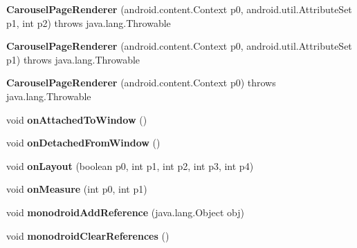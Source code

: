 \begin{DoxyCompactItemize}
\item 
\mbox{\label{classmd5b60ffeb829f638581ab2bb9b1a7f4f3f_1_1_carousel_page_renderer_a345df8dd6878c845c18ebccd4fe946ad}} 
{\bfseries Carousel\+Page\+Renderer} (android.\+content.\+Context p0, android.\+util.\+Attribute\+Set p1, int p2)  throws java.\+lang.\+Throwable 	
\item 
\mbox{\label{classmd5b60ffeb829f638581ab2bb9b1a7f4f3f_1_1_carousel_page_renderer_a1854123685532643ee3bacaf48a7c075}} 
{\bfseries Carousel\+Page\+Renderer} (android.\+content.\+Context p0, android.\+util.\+Attribute\+Set p1)  throws java.\+lang.\+Throwable 	
\item 
\mbox{\label{classmd5b60ffeb829f638581ab2bb9b1a7f4f3f_1_1_carousel_page_renderer_a5d9cc96ac94ffa57b9229e1b243f3137}} 
{\bfseries Carousel\+Page\+Renderer} (android.\+content.\+Context p0)  throws java.\+lang.\+Throwable 	
\item 
\mbox{\label{classmd5b60ffeb829f638581ab2bb9b1a7f4f3f_1_1_carousel_page_renderer_ab5741f0bb83e951d5427e52f40d1abb3}} 
void {\bfseries on\+Attached\+To\+Window} ()
\item 
\mbox{\label{classmd5b60ffeb829f638581ab2bb9b1a7f4f3f_1_1_carousel_page_renderer_afe23a27b24ac448267fc932f75ef5716}} 
void {\bfseries on\+Detached\+From\+Window} ()
\item 
\mbox{\label{classmd5b60ffeb829f638581ab2bb9b1a7f4f3f_1_1_carousel_page_renderer_af11f357363dd9368b7df9be259fd7574}} 
void {\bfseries on\+Layout} (boolean p0, int p1, int p2, int p3, int p4)
\item 
\mbox{\label{classmd5b60ffeb829f638581ab2bb9b1a7f4f3f_1_1_carousel_page_renderer_a5bd9181559c99a4fe32a57d915ec6751}} 
void {\bfseries on\+Measure} (int p0, int p1)
\item 
\mbox{\label{classmd5b60ffeb829f638581ab2bb9b1a7f4f3f_1_1_carousel_page_renderer_a3887bda40516040ce44ded44b90eed5a}} 
void {\bfseries monodroid\+Add\+Reference} (java.\+lang.\+Object obj)
\item 
\mbox{\label{classmd5b60ffeb829f638581ab2bb9b1a7f4f3f_1_1_carousel_page_renderer_ae1977d178a6be8e92ddec489238ad42a}} 
void {\bfseries monodroid\+Clear\+References} ()
\end{DoxyCompactItemize}
